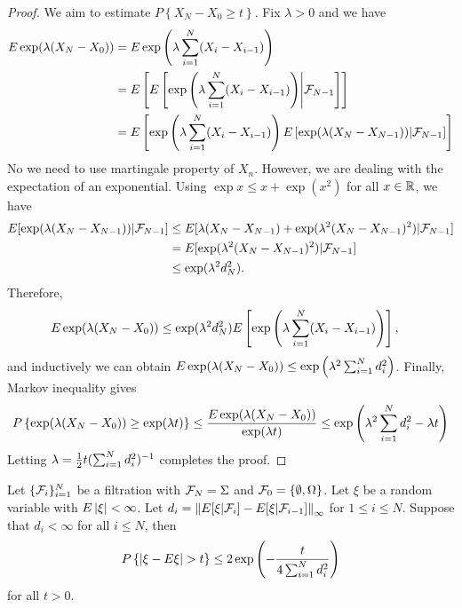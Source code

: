 \documentclass[a4paper]{article}
\begin{document}
\begin{proof}
  We aim to estimate $P \left\{ X_N - X_0 \geq t \right\}$.
  Fix $\lambda > 0$ and we have
  \begin{align*}
    E \exp (\lambda (X_N - X_0))
     & = E \exp \left( \lambda \sum_{i=1}^N (X_i - X_{i - 1}) \right)                      \\
     & = E \left[ E \left[ \exp \left( \lambda \sum_{i=1}^N (X_i - X_{i - 1})
               \right) \middle|  \mathcal{F}_{N - 1} \right] \right]              \\
     & = E \left[ \exp \left( \lambda \sum_{i=1}^N (X_i - X_{i - 1}) \right)
             E \left[ \exp (\lambda (X_N - X_{N - 1})) | \mathcal{F}_{N- 1} \right] \right]
  \end{align*}
  No we need to use martingale property of $X_n$. However, we
  are dealing with the expectation of an exponential. Using
  $\exp x \leq x + \exp (x^2)$ for all $x \in \mathbb{R}$, we have
  \begin{align*}
    E [\exp (\lambda (X_N - X_{N - 1})) | \mathcal{F}_{N - 1}]
     & \leq E [\lambda (X_N - X_{N - 1}) + \exp (\lambda^2 (X_N - X_{N - 1})^2)
                | \mathcal{F}_{N - 1}] \\
     & = E [\exp (\lambda^2 (X_N - X_{N - 1})^2) | \mathcal{F}_{N - 1}]               \\
     & \leq \exp (\lambda^2 d_N^2).
  \end{align*}
  Therefore,
  \begin{align*}
    E \exp (\lambda (X_N - X_0))
     & \leq \exp (\lambda^2 d_N^2)
    E \left[ \exp \left( \lambda \sum_{i=1}^N (X_i - X_{i - 1}) \right) \right],
  \end{align*}
  and inductively we can obtain
  $E \exp (\lambda (X_N - X_0)) \leq \exp \left( \lambda^2 \sum_{i=1}^N d_i^2 \right)$.
  Finally, Markov inequality gives
  \[
    P \left\{ \exp (\lambda (X_N - X_0)) \geq \exp (\lambda t) \right\}
    \leq \frac{E \exp (\lambda (X_N - X_0))}{\exp (\lambda t)}
    \leq \exp \left( \lambda^2 \sum_{i=1}^N d_i^2 - \lambda t \right)
  \]
  Letting $\lambda = \frac{1}{2} t (\sum_{i=1}^N d_i^2)^{-1}$ completes the
  proof.

\end{proof}

\begin{cor}
  Let $\{ \mathcal{F}_i \}_{i=1}^N$ be a filtration with $\mathcal{F}_N = \Sigma$ and
  $\mathcal{F}_0 = \{ \emptyset, \Omega \}$.
  Let $\xi$ be a random variable with $E \left\lvert \xi\right\rvert < \infty$.
  Let $d_i = \left\lVert  E[\xi | \mathcal{F}_i] - E [\xi | \mathcal{F}_{i - 1}]\right\rVert_\infty$
  for $1 \leq i \leq N$. Suppose that $d_i < \infty$ for all
  $i \leq N$, then
  \[
    P \left\{ \left\lvert \xi - E \xi\right\rvert > t \right\}
    \leq 2 \exp \left( - \frac{t}{4 \sum_{i=1}^N d_i^2} \right)
  \]
  for all $t > 0$.
\end{cor}
\end{document}
